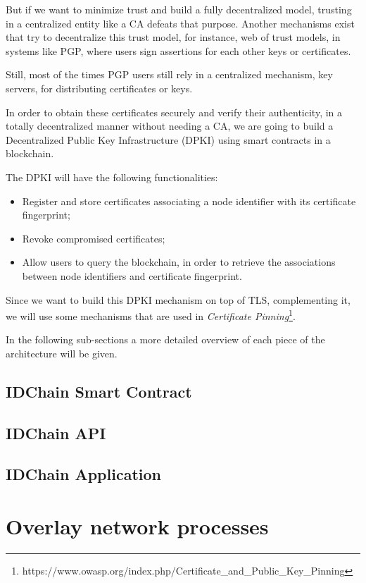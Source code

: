 But if we want to minimize trust and build a fully decentralized model, trusting in a centralized entity like a \ac{CA} defeats that purpose.
Another mechanisms exist that try to decentralize this trust model, for instance, web of trust models, in systems like \ac{PGP}, where users sign assertions for each other keys or certificates.

Still, most of the times \ac{PGP} users still rely in a centralized mechanism, key servers, for distributing certificates or keys.

In order to obtain these certificates securely and verify their authenticity, in a totally decentralized manner without needing a CA, we are going to build a Decentralized Public Key Infrastructure (DPKI) using smart contracts in a blockchain.

The DPKI will have the following functionalities:
\begin{itemize}
	\item Register and store certificates associating a node identifier with its certificate fingerprint;
	\item Revoke compromised certificates;
	\item Allow users to query the blockchain, in order to retrieve the associations between node identifiers and certificate fingerprint.
\end{itemize}

Since we want to build this DPKI mechanism on top of TLS, complementing it, we will use some mechanisms that are used in \textit{Certificate Pinning}\footnote{https://www.owasp.org/index.php/Certificate\_and\_Public\_Key\_Pinning}.

In the following sub-sections a more detailed overview of each piece of the architecture will be given.

\subsection{IDChain Smart Contract}

\subsection{IDChain API}

\subsection{IDChain Application}

\section{Overlay network processes}

